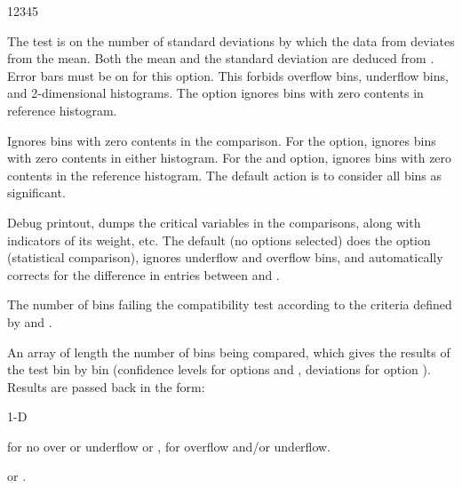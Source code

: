 \begin{DLtt}{12345}
\begin{DLtt}{1}
                       The test is on the number of standard deviations by 
                       which the data from  deviates from the mean.  
                       Both the mean and the standard deviation are deduced 
                       from .
                       Error bars must be on for this option.  
                       This forbids overflow bins, underflow bins, and 
                       2-dimensional histograms.  
                       The  option ignores bins with zero contents 
                       in reference histogram.
             \item[Z]  Ignores bins with zero contents in the comparison.  
                       For the  option, ignores bins with zero 
                       contents in either histogram.
                       For the  and  option, ignores bins 
                       with zero contents in the reference histogram.  
                       The default action is to consider all
                       bins as significant.
             \item[D]  Debug printout, dumps the critical variables in the
                       comparisons, along with indicators of its weight, etc.
                       The default (no options selected) does the  
                       option (statistical comparison), ignores underflow 
                       and overflow bins, and automatically corrects for the
                       difference in entries between  and .
             \end{DLtt}
\item[{\rm\bf Output parameters:}]
\item[NBAD*]  The number of bins failing the compatibility test according
              to the criteria defined by  and .
\item[DIFFS*] An array of length the number of bins being compared, which
              gives the results of the test bin by bin (confidence levels for
              options  and , deviations for option ).
              Results are passed back in the form:
              \begin{DL}{1-D}
              \item[1-D]  for no over or underflow or
                         ,
                         for overflow and/or underflow.
              \item[2-D]  or .
              \end{DL}
\end{DLtt}


